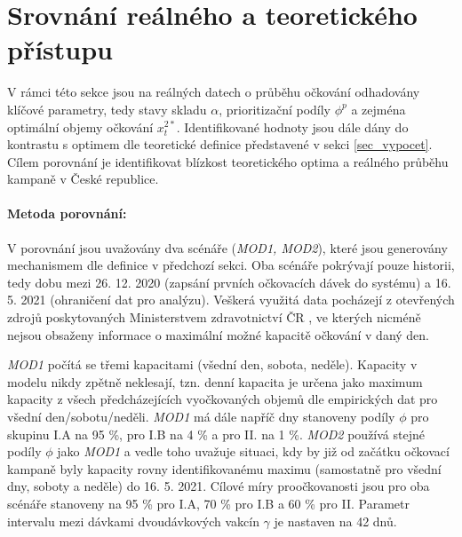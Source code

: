\section*{Srovnání reálného a teoretického přístupu}

%
V rámci této sekce jsou na reálných datech o průběhu očkování odhadovány klíčové parametry, tedy stavy skladu $\alpha$, prioritizační podíly $\phi^{p}$ a zejména optimální objemy očkování $x_{t}^{2*}$. Identifikované hodnoty jsou dále dány do kontrastu s optimem dle teoretické definice představené v sekci \ref{sec_vypocet}. 
Cílem porovnání je identifikovat blízkost teoretického optima a reálného průběhu kampaně v České republice.




\paragraph{Metoda porovnání: }\label{sec:comparison}V porovnání jsou uvažovány dva scénáře (\emph{MOD1, MOD2}), které  jsou generovány mechanismem dle definice v předchozí sekci. Oba scénáře pokrývají pouze historii, tedy dobu mezi 26. 12. 2020 (zapsání prvních očkovacích dávek do systému) a 16. 5. 2021 (ohraničení dat pro analýzu).
Veškerá využitá data pocházejí z otevřených zdrojů poskytovaných Ministerstvem zdravotnictví ČR \cite{mzcr_data}, ve kterých nicméně nejsou obsaženy informace o maximální možné kapacitě očkování v daný den. 





\emph{MOD1} počítá se třemi kapacitami (všední den, sobota, neděle). Kapacity v modelu nikdy zpětně neklesají, tzn. denní kapacita je určena jako maximum kapacity z %
všech předcházejících vyočkovaných objemů dle empirických dat pro všední den/sobotu/neděli. \emph{MOD1} má dále napříč dny stanoveny podíly $\phi$ pro skupinu I.A na 95 \%, pro I.B na 4 \% a pro II. na 1 \%.
%
\emph{MOD2} používá stejné podíly  $\phi$ jako \emph{MOD1} a vedle toho uvažuje situaci, kdy by již od začátku očkovací kampaně byly kapacity rovny identifikovanému maximu (samostatně pro všední dny, soboty a neděle) do 16. 5. 2021. 
%
Cílové míry proočkovanosti jsou pro oba scénáře stanoveny na 95 \% pro I.A, 70 \% pro I.B a 60 \% pro II. Parametr intervalu mezi dávkami dvoudávkových vakcín $\gamma$ je nastaven na 42 dnů.


